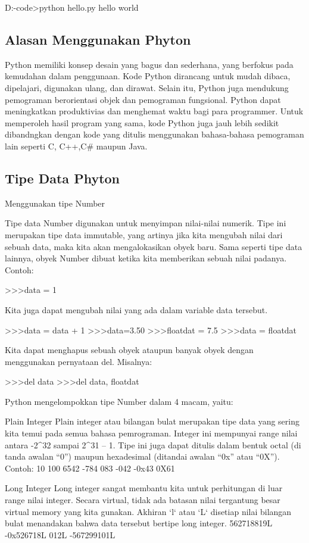 D:\python-code>python hello.py
hello world


\subsection{Alasan Menggunakan Phyton}

Python memiliki konsep desain yang bagus dan sederhana, yang berfokus pada kemudahan dalam penggunaan. Kode Python dirancang untuk mudah dibaca, dipelajari, digunakan ulang, dan dirawat. Selain itu, Python juga mendukung pemograman berorientasi objek dan pemograman fungsional.
Python dapat meningkatkan produktivias dan menghemat waktu bagi para programmer. Untuk memperoleh hasil program yang sama, kode Python juga jauh lebih sedikit dibandngkan dengan kode yang ditulis menggunakan bahasa-bahasa pemograman lain seperti C, C++,C# maupun Java.


\subsection{Tipe Data Phyton}
	Menggunakan tipe Number

Tipe data Number digunakan untuk menyimpan nilai-nilai numerik. Tipe ini merupakan tipe data immutable, yang artinya jika kita mengubah nilai dari sebuah data, maka kita akan mengalokasikan obyek baru. Sama seperti tipe data lainnya, obyek Number dibuat ketika kita memberikan sebuah nilai padanya. Contoh:

>>>data = 1

Kita juga dapat mengubah nilai yang ada dalam variable data tersebut.

>>>data = data + 1
>>>data=3.50
>>>floatdat = 7.5
>>>data = floatdat

Kita dapat menghapus sebuah obyek ataupun banyak obyek dengan menggunakan pernyataan del. Misalnya:

>>>del data
>>>del data, floatdat

Python mengelompokkan tipe Number dalam 4 macam, yaitu:

Plain Integer
Plain integer atau bilangan bulat merupakan tipe data yang sering kita temui pada semua bahasa pemrograman. Integer ini mempunyai range nilai antara -2^32 sampai 2^31 – 1. Tipe ini juga dapat ditulis dalam bentuk octal (di tanda awalan “0”) maupun hexadesimal (ditandai awalan “0x” atau “0X”). Contoh:
10 100 6542 -784
083 -042 -0x43 0X61

Long Integer
Long integer sangat membantu kita untuk perhitungan di luar range nilai integer. Secara virtual, tidak ada batasan nilai tergantung besar virtual memory yang kita gunakan. Akhiran ‘l‘ atau ‘L‘ disetiap nilai bilangan bulat menandakan bahwa data tersebut bertipe long integer.
562718819L -0x526718L 012L -567299101L

